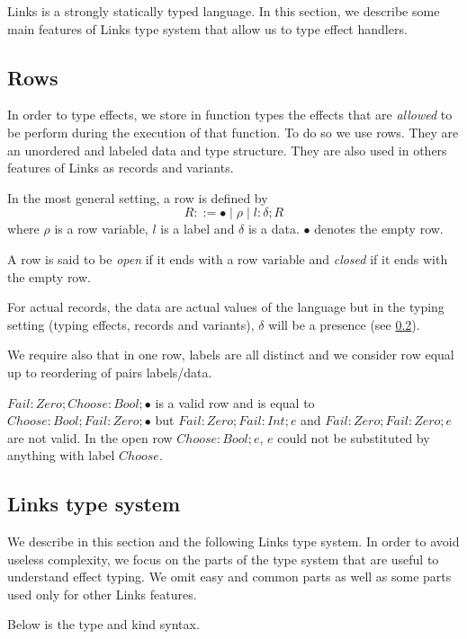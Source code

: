 \documentclass[10pt, nonacm=true, language=french, language=english]{acmart}
\begin{document}
Links is a strongly statically typed language. In this section, we describe some main features of Links type system that allow us to type effect handlers.

\subsection{Rows}
\label{sec:row-typ}

In order to type effects, we store in function types the effects that are \emph{allowed} to be perform during the execution of that function. To do so we use rows. They are an unordered and labeled data and type structure. They are also used in others features of Links as records and variants.

In the most general setting, a row is defined by
\[
  R ::= \bullet \mid \rho \mid l:\delta;R
\]
where $\rho$ is a row variable, $l$ is a label and $\delta$ is a data. $\bullet$ denotes the empty row.

A row is said to be \emph{open} if it ends with a row variable and \emph{closed} if it ends with the empty row.

For actual records, the data are actual values of the language but in the typing setting (typing effects, records and variants), $\delta$ will be a presence (see \ref{sec:links-typ}).

We require also that in one row, labels are all distinct and we consider row equal up to reordering of pairs labels/data.

\begin{ex}
  $Fail:Zero; Choose:Bool; \bullet$ is a valid row and is equal to $Choose:Bool; Fail:Zero; \bullet$ but $Fail:Zero; Fail:Int; e$ and $Fail:Zero; Fail:Zero; e$ are not valid. In the open row $Choose:Bool; e$, $e$ could not be substituted by anything with label $Choose$.
\end{ex}


\subsection{Links type system}
\label{sec:links-typ}

We describe in this section and the following Links type system. In order to avoid useless complexity, we focus on the parts of the type system that are useful to understand effect typing. We omit easy and common parts as well as some parts used only for other Links features.

Below is the type and kind syntax.
\end{document}
